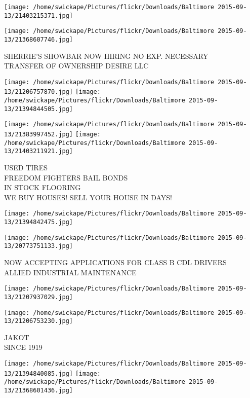 \documentclass[10pt,letterpaper]{article}
\begin{document}
\texttt{[image: /home/swickape/Pictures/flickr/Downloads/Baltimore 2015-09-13/21403215371.jpg]}

\vspace{0.25in}
\texttt{[image: /home/swickape/Pictures/flickr/Downloads/Baltimore 2015-09-13/21368607746.jpg]}

SHERRIE'S SHOWBAR NOW HIRING NO EXP. NECESSARY\\
TRANSFER OF OWNERSHIP DESIRE LLC\\
\pagebreak

\texttt{[image: /home/swickape/Pictures/flickr/Downloads/Baltimore 2015-09-13/21206757870.jpg]}
\texttt{[image: /home/swickape/Pictures/flickr/Downloads/Baltimore 2015-09-13/21394844505.jpg]}

\texttt{[image: /home/swickape/Pictures/flickr/Downloads/Baltimore 2015-09-13/21383997452.jpg]}
\texttt{[image: /home/swickape/Pictures/flickr/Downloads/Baltimore 2015-09-13/21403211921.jpg]}

USED TIRES\\
FREEDOM FIGHTERS BAIL BONDS\\
IN STOCK FLOORING\\
WE BUY HOUSES!  SELL YOUR HOUSE IN DAYS!\\
\pagebreak

\texttt{[image: /home/swickape/Pictures/flickr/Downloads/Baltimore 2015-09-13/21394842475.jpg]}

\vspace{0.25in}
\texttt{[image: /home/swickape/Pictures/flickr/Downloads/Baltimore 2015-09-13/20773751133.jpg]}

NOW ACCEPTING APPLICATIONS FOR CLASS B CDL DRIVERS\\
ALLIED INDUSTRIAL MAINTENANCE\\
\pagebreak

\texttt{[image: /home/swickape/Pictures/flickr/Downloads/Baltimore 2015-09-13/21207937029.jpg]}

\vspace{0.25in}
\texttt{[image: /home/swickape/Pictures/flickr/Downloads/Baltimore 2015-09-13/21206753230.jpg]}

JAKOT\\
SINCE 1919\\
\pagebreak

\texttt{[image: /home/swickape/Pictures/flickr/Downloads/Baltimore 2015-09-13/21394840085.jpg]}
\texttt{[image: /home/swickape/Pictures/flickr/Downloads/Baltimore 2015-09-13/21368601436.jpg]}
\end{document}
